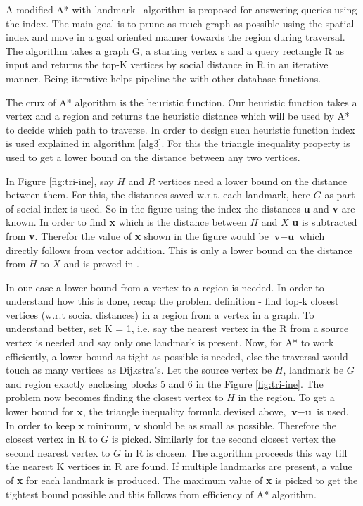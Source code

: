 A modified A* with landmark~\cite{AC2005} algorithm is proposed for answering {\rrp} queries using the {\grp} index. The main goal is to prune as much graph as possible using the spatial index and move in a goal oriented manner towards the region during traversal. The algorithm takes a graph G, a starting vertex s and a query rectangle R as input and returns the top-K vertices by social distance in R in an iterative manner. Being iterative helps pipeline the {\rrp} with other database functions.

The crux of A* algorithm is the heuristic function. Our heuristic function takes a vertex and a region and returns the heuristic distance which will be used by A* to decide which path to traverse. In order to design such heuristic function {\grpsocial} index is used explained in algorithm \ref{alg3}. For this the triangle inequality property is used to get a lower bound on the distance between any two vertices.

In Figure \ref{fig:tri-ine}, say $H$ and $R$ vertices need a lower bound on the distance between them. For this, the distances saved w.r.t. each landmark, here $G$ as part of social {\grp} index is used. So in the figure using the index the distances \textbf{u} and \textbf{v} are known. In order to find \textbf{x} which is the distance between $H$ and $X$ \textbf{u} is subtracted from \textbf{v}. Therefor the value of \textbf{x} shown in the figure would be $\textbf{v} - \textbf{u}$ which directly follows from vector addition. This is only a lower bound on the distance from $H$ to $X$ and is proved in \cite{AC2005}.

In our case a lower bound from a vertex to a region is needed. In order to understand how this is done, recap the problem definition - find top-k closest vertices (w.r.t social distances) in a region from a vertex in a graph. To understand better, set K = 1, i.e. say the nearest vertex in the R from a source vertex is needed and say only one landmark is present. Now, for A* to work efficiently, a lower bound as tight as possible is needed, else the traversal would touch as many vertices as Dijkstra's. Let the source vertex be $H$, landmark be $G$ and region exactly enclosing blocks 5 and 6 in the Figure \ref{fig:tri-ine}. The problem now becomes finding the closest vertex to $H$ in the region. To get a lower bound for $\textbf{x}$, the triangle inequality formula devised above, $\textbf{v} - \textbf{u}$ is used. In order to keep $\textbf{x}$ minimum, $\textbf{v}$ should be as small as possible. Therefore the closest vertex in R to $G$ is picked. Similarly for the second closest vertex the second nearest vertex to $G$ in R is chosen. The algorithm proceeds this way till the nearest K vertices in R are found. If multiple landmarks are present, a value of \textbf{x} for each landmark is produced. The maximum value of \textbf{x} is picked to get the tightest bound possible and this follows from efficiency of A* algorithm.

